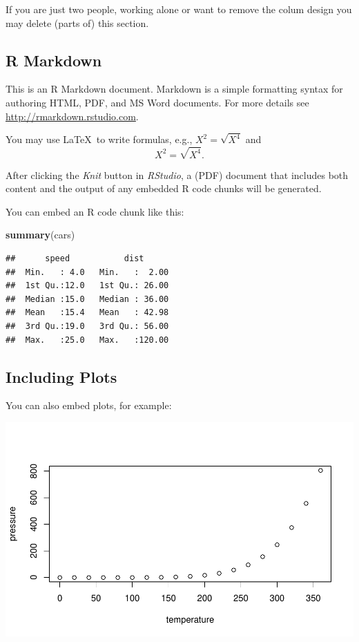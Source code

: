 \documentclass[11pt,a4paper]{article}
\let\origfigure\figure
\let\endorigfigure\endfigure
\renewenvironment{figure}[1][2] {
    \expandafter\origfigure\expandafter[H]
} {
    \endorigfigure
}
\newenvironment{Shaded}{\begin{snugshade}}{\end{snugshade}}
\newcommand{\FunctionTok}[1]{\textcolor[rgb]{0.13,0.29,0.53}{\textbf{#1}}}
\newcommand{\NormalTok}[1]{#1}
\begin{document}
If you are just two people, working alone or want to remove the colum
design you may delete (parts of) this section.

\hypertarget{r-markdown}{%
\subsection{R Markdown}\label{r-markdown}}

This is an R Markdown document. Markdown is a simple formatting syntax
for authoring HTML, PDF, and MS Word documents. For more details see
\url{http://rmarkdown.rstudio.com}.

You may use \LaTeX~to write formulas, e.g., \(X^2 = \sqrt{X^4}\) and
\[X^2 = \sqrt{X^4}.\]

After clicking the \emph{Knit} button in \emph{RStudio}, a (PDF)
document that includes both content and the output of any embedded R
code chunks will be generated.

You can embed an R code chunk like this:

\begin{Shaded}
\begin{Highlighting}[]
\FunctionTok{summary}\NormalTok{(cars)}
\end{Highlighting}
\end{Shaded}

\begin{verbatim}
##      speed           dist       
##  Min.   : 4.0   Min.   :  2.00  
##  1st Qu.:12.0   1st Qu.: 26.00  
##  Median :15.0   Median : 36.00  
##  Mean   :15.4   Mean   : 42.98  
##  3rd Qu.:19.0   3rd Qu.: 56.00  
##  Max.   :25.0   Max.   :120.00
\end{verbatim}

\hypertarget{including-plots}{%
\subsection{Including Plots}\label{including-plots}}

You can also embed plots, for example:

\begin{figure}
\centering
\includegraphics{paper_files/figure-latex/pressure-1.pdf}
\caption{\label{fig:pressure} Pressure}
\end{figure}
\end{document}

